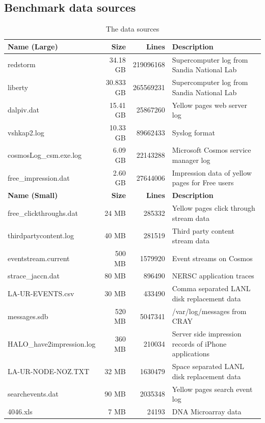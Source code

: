 \subsection{Benchmark data sources}
\begin{table}[!ht]
\centering
\begin{tabular}{|l|r|r|l|} \hline
{\bf Name (Large)} & {\bf Size} & {\bf Lines} & {\bf Description} \\ \hline
redstorm & 34.18 GB & 219096168 & Supercomputer log from Sandia National Lab    \\ \hline
liberty & 30.833 GB & 265569231 &       Supercomputer log from Sandia National Lab\\ \hline
dalpiv.dat & 15.41 GB & 25867260 &      Yellow pages web server log \\ \hline
vshkap2.log & 10.33 GB & 89662433       & Syslog format \\ \hline
cosmosLog\_csm.exe.log & 6.09 GB & 22143288 & Microsoft Cosmos service manager log\\ \hline
free\_impression.dat & 2.60 GB & 27644006 & Impression data of yellow pages for Free users\\ \hline \hline
{\bf Name (Small)} & {\bf Size} & {\bf Lines} & {\bf Description} \\ \hline
free\_clickthroughs.dat & 24 MB & 285332 & Yellow pages click through stream data \\ \hline
thirdpartycontent.log & 40 MB & 281519 &        Third party content stream data \\ \hline
eventstream.current & 500 MB & 1579920 &        Event streams on Cosmos \\ \hline
strace\_jaccn.dat & 80 MB & 896490 & NERSC application traces \\ \hline
LA-UR-EVENTS.csv & 30 MB &  433490 & Comma separated LANL disk replacement data\\ \hline
messages.sdb & 520 MB & 5047341 &       /var/log/messages from CRAY\\ \hline
HALO\_have2impression.log & 360 MB &  210034 & Server side impression records of iPhone applications\\ \hline
LA-UR-NODE-NOZ.TXT & 32 MB &  1630479 & Space separated LANL disk replacement data\\ \hline
searchevents.dat & 90 MB & 2035348 & Yellow pages search event log \\ \hline
4046.xls & 7 MB & 24193 & DNA Microarray data\\ \hline
\end{tabular}
\caption{The data sources}
\label{tab:sources}
\end{table}


